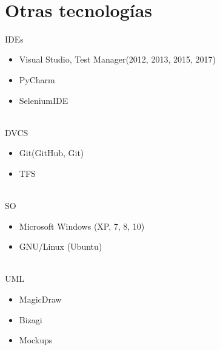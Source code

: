 \documentclass[letterpaper]{twentysecondcv} %
\begin{document}
\pagebreak

\begin{twenty}
\twentyitem
    	{}
		{}
        {}
        {}
        {}
        {}
        \\
 \end{twenty} 
\section{Otras tecnologías}
\begin{twenty}
	
	\twentyitem
    	{IDEs}
		{}
        {}
        {}
        {}
        {
        {\begin{itemize}
        \item Visual Studio, Test Manager(2012, 2013, 2015, 2017)
        \item PyCharm
        \item SeleniumIDE
		\end{itemize}}
        }
        \\
        \twentyitem
    	{DVCS}
		{}
        {}
        {}
        {}
        {
        {\begin{itemize}
        \item Git(GitHub, Git)
        \item TFS
		\end{itemize}}
		}
		\\
        \twentyitem
	    {SO}
		{}
        {}
        {}
        {}
        {
        {\begin{itemize}
        \item Microsoft Windows (XP, 7, 8, 10)
        \item GNU/Linux (Ubuntu)
		\end{itemize}}
		}
		\\
        \twentyitem
	    {UML}
		{}
        {}
        {}
        {}
        {
        {\begin{itemize}
        \item MagicDraw
        \item Bizagi
        \item Mockups
		\end{itemize}}
		}
\end{twenty}
\end{document}
